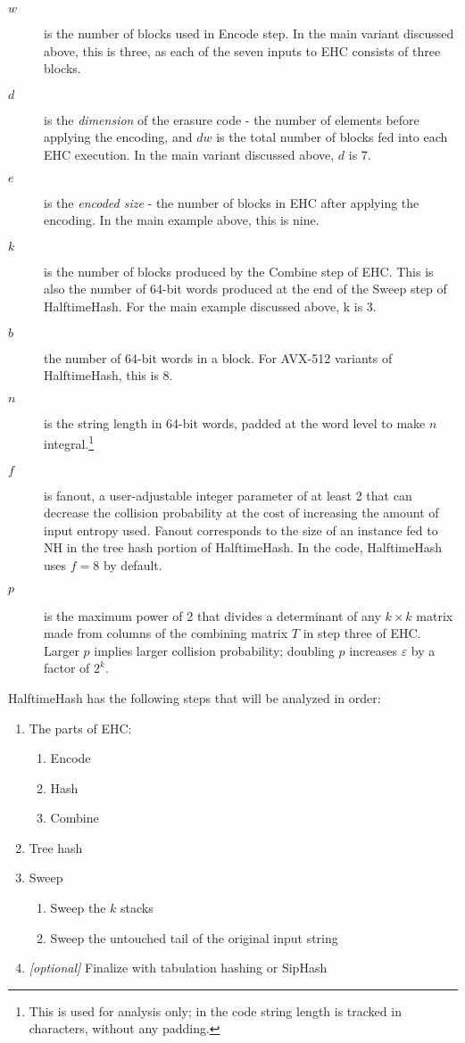 \documentclass[sigconf, nonacm]{acmart}
\begin{document}
\begin {description}
\item[$w$] is the number of blocks used in Encode step.
  In the main variant discussed above, this is three, as each of the seven inputs to EHC consists of three blocks.
\item[$d$] is the {\em dimension} of the erasure code - the number of elements before applying the encoding, and $d w$ is the total number of blocks fed into each EHC execution.
  In the main variant discussed above, $d$ is 7.
\item[$e$] is the {\em encoded size} - the number of blocks in EHC after applying the encoding.
  In the main example above, this is nine.
\item[$k$] is the number of blocks produced by the Combine step of EHC.
  This is also the number of 64-bit words produced at the end of the Sweep step of HalftimeHash.
  For the main example discussed above, k is 3.
\item[$b$] the number of 64-bit words in a block.
  For AVX-512 variants of HalftimeHash, this is 8.
\item[$n$] is the string length in 64-bit words, padded at the word level to make $n$ integral.\footnote{This is used for analysis only; in the code string length is tracked in characters, without any padding.}
\item[$f$] is fanout, a user-adjustable integer parameter of at least 2 that can decrease the collision probability at the cost of increasing the amount of input entropy used.
  Fanout corresponds to the size of an instance fed to NH in the tree hash portion of HalftimeHash.
  In the code, HalftimeHash uses $f = 8$ by default.
\item[$p$] is the maximum power of 2 that divides a determinant of any $k \times k$ matrix made from columns of the combining matrix $T$ in step three of EHC.
  Larger $p$ implies larger collision probability; doubling $p$ increases $\varepsilon$ by a factor of $2^k$.
\end{description}

HalftimeHash has the following steps that will be analyzed in order:

\begin{enumerate}
\item The parts of EHC:
  \begin {enumerate}
  \item Encode
  \item Hash
  \item Combine
  \end{enumerate}
\item Tree hash
\item Sweep
  \begin{enumerate}
  \item Sweep the $k$ stacks
  \item Sweep the untouched tail of the original input string
  \end{enumerate}
\item{} {\em [optional]} Finalize with tabulation hashing or SipHash
\end{enumerate}
\end{document}
